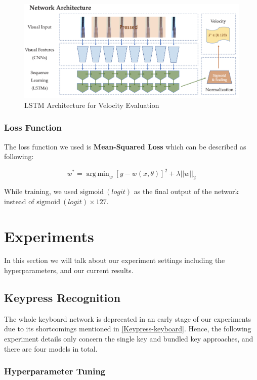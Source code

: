\documentclass[10pt,twocolumn,letterpaper]{article}
\DeclareMathOperator*{\argmin}{arg\,min}
\begin{document}
   \begin{figure}[h!]
      \centering
      \includegraphics[width=\linewidth]{fig/13.png}
      \caption{LSTM Architecture for Velocity Evaluation} \label{fig:5}
   \end{figure}

   \subsubsection{Loss Function}

   The loss function we used is \textbf{Mean-Squared Loss} which can be described as following:

   \[w^*=\argmin_w[y - w(x, \theta)]^2+\lambda||w||_2\]

   While training, we used \(\text{sigmoid}\ (logit)\) as the final output of the network instead of \(\text{sigmoid}\ (logit) \times 127\).

\section{Experiments}

In this section we will talk about our experiment settings including the hyperparameters, and our current results.

\subsection{Keypress Recognition}

The whole keyboard network is deprecated in an early stage of our experiments due to its shortcomings mentioned in \ref{Keypress-keyboard}. 
Hence, the following experiment details only concern the single key and bundled key approaches, and there are four models in total.

\subsubsection{Hyperparameter Tuning}
\end{document}
